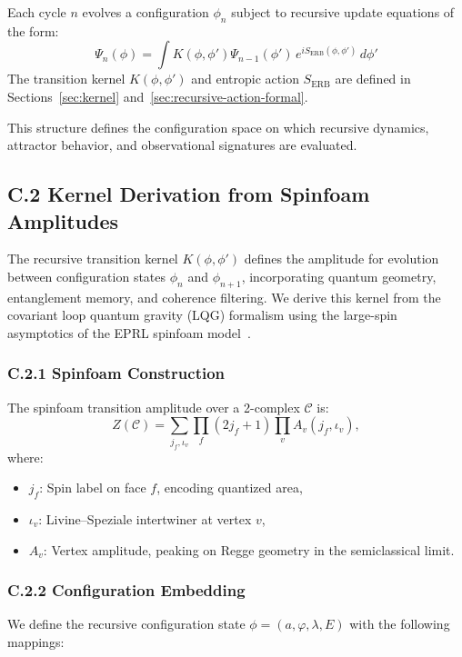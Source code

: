 Each cycle \( n \) evolves a configuration \( \phi_n \) subject to recursive update equations of the form:
\[
\Psi_n(\phi) = \int K(\phi, \phi') \Psi_{n-1}(\phi') \, e^{i S_{\text{ERB}}(\phi, \phi')} \, d\phi'
\]
The transition kernel \( K(\phi, \phi') \) and entropic action \( S_{\text{ERB}} \) are defined in Sections~\ref{sec:kernel} and~\ref{sec:recursive-action-formal}.

This structure defines the configuration space on which recursive dynamics, attractor behavior, and observational signatures are evaluated.

\subsection*{C.2 Kernel Derivation from Spinfoam Amplitudes}
\label{appendix:C2}

The recursive transition kernel \( K(\phi, \phi') \) defines the amplitude for evolution between configuration states \(\phi_n\) and \(\phi_{n+1}\), incorporating quantum geometry, entanglement memory, and coherence filtering. We derive this kernel from the covariant loop quantum gravity (LQG) formalism using the large-spin asymptotics of the EPRL spinfoam model~\cite{barrett2009asymptotic, engle2008lqg}.

\subsubsection*{C.2.1 Spinfoam Construction}

The spinfoam transition amplitude over a 2-complex \(\mathcal{C}\) is:
\[
Z(\mathcal{C}) = \sum_{j_f, \iota_v} \prod_f (2j_f + 1) \prod_v A_v(j_f, \iota_v),
\]
where:
\begin{itemize}
  \item \( j_f \): Spin label on face \( f \), encoding quantized area,
  \item \( \iota_v \): Livine--Speziale intertwiner at vertex \( v \),
  \item \( A_v \): Vertex amplitude, peaking on Regge geometry in the semiclassical limit.
\end{itemize}

\subsubsection*{C.2.2 Configuration Embedding}

We define the recursive configuration state \(\phi = (a, \varphi, \lambda, E)\) with the following mappings:

